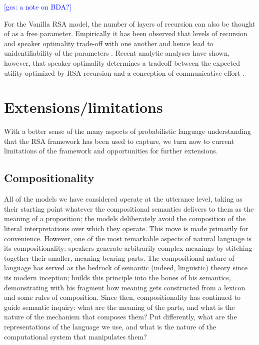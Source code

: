 \documentclass{sp}
\newcommand{\gcs}[1]{\textcolor{blue}{[gcs: #1]}}
\newcommand{\mht}[1]{\textcolor{purple}{[mht: #1]}}
\begin{document}
\gcs{a note on BDA?}

For the Vanilla RSA model, the number of layers of recursion can also be thought of as a free parameter. Empirically it has been observed that levels of recursion and speaker optimality trade-off with one another  and hence lead to unidentifiability of the parameters \citep{frank2016rational}. Recent analytic analyses have shown, however, that speaker optimality determines a tradeoff between the expected utility optimized by RSA recursion and a conception of communicative effort \citep{zaslavsky2020rate}.

 





\section{Extensions/limitations} \label{limitations}

With a better sense of the many aspects of probabilistic language understanding that the RSA framework has been used to capture, we turn now to current limitations of the framework and opportunities for further extensions.

\subsection{Compositionality}

All of the models we have considered operate at the utterance level, taking as their starting point whatever the compositional semantics delivers to them as the meaning of a proposition; the models deliberately avoid the composition of the literal interpretations over which they operate. This move is made primarily for convenience. However, one of the most remarkable aspects of natural language is its compositionality: speakers generate arbitrarily complex meanings by stitching together their smaller, meaning-bearing parts. The compositional nature of language has served as the bedrock of semantic (indeed, linguistic) theory since its modern inception; \cite{montague1973} builds this principle into the bones of his semantics, demonstrating with his fragment how meaning gets constructed from a lexicon and some rules of composition. Since then, compositionality has continued to guide semantic inquiry: what are the meaning of the parts, and what is the nature of the mechanism that composes them? Put differently, what are the representations of the language we use, and what is the nature of the computational system that manipulates them? 
\end{document}
